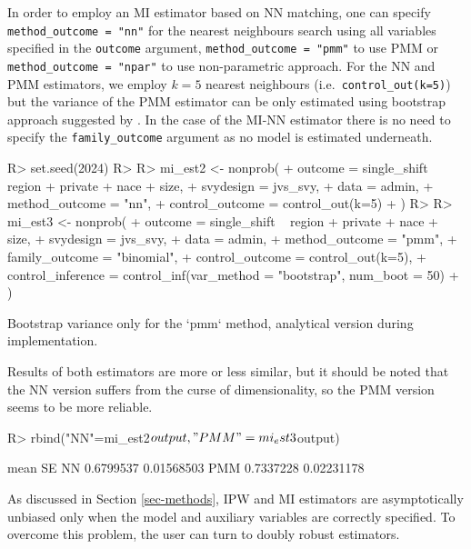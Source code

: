 \documentclass[
]{jss}
\begin{document}
In order to employ an MI estimator based on NN matching, one can specify
\texttt{method\_outcome\ =\ "nn"} for the nearest neighbours search
using all variables specified in the \texttt{outcome} argument,
\texttt{method\_outcome\ =\ "pmm"} to use PMM or
\texttt{method\_outcome\ =\ "npar"} to use non-parametric approach. For
the NN and PMM estimators, we employ \(k=5\) nearest neighbours
(i.e.~\texttt{control\_out(k=5)}) but the variance of the PMM estimator
can be only estimated using bootstrap approach suggested by
\citet{chlebicki2025}. In the case of the MI-NN estimator there is no
need to specify the \texttt{family\_outcome} argument as no model is
estimated underneath.

\begin{CodeChunk}
\begin{CodeInput}
R> set.seed(2024)
R> 
R> mi_est2 <- nonprob(
+   outcome = single_shift ~ region + private + nace + size,
+   svydesign = jvs_svy,
+   data = admin,
+   method_outcome = "nn",
+   control_outcome = control_out(k=5)
+ )
R> 
R> mi_est3 <- nonprob(
+   outcome = single_shift ~ region + private + nace + size,
+   svydesign = jvs_svy,
+   data = admin,
+   method_outcome = "pmm",
+   family_outcome = "binomial", 
+   control_outcome = control_out(k=5),
+   control_inference = control_inf(var_method = "bootstrap", num_boot = 50)
+ )
\end{CodeInput}
\begin{CodeOutput}
Bootstrap variance only for the `pmm` method, analytical version during implementation.
\end{CodeOutput}
\end{CodeChunk}

Results of both estimators are more or less similar, but it should be
noted that the NN version suffers from the curse of dimensionality, so
the PMM version seems to be more reliable.

\begin{CodeChunk}
\begin{CodeInput}
R> rbind("NN"=mi_est2$output, "PMM"=mi_est3$output)
\end{CodeInput}
\begin{CodeOutput}
         mean         SE
NN  0.6799537 0.01568503
PMM 0.7337228 0.02231178
\end{CodeOutput}
\end{CodeChunk}

As discussed in Section \ref{sec-methods}, IPW and MI estimators are
asymptotically unbiased only when the model and auxiliary variables are
correctly specified. To overcome this problem, the user can turn to
doubly robust estimators.
\end{document}
